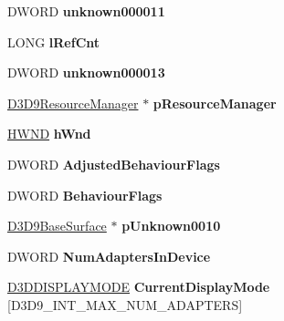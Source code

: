 \begin{DoxyCompactItemize}
D\+W\+O\+RD {\bfseries unknown000011}
\item 
\mbox{\label{struct___direct3_d_device9___i_n_t_a3ea35570c04f0521870ac3194a59e335}} 
L\+O\+NG {\bfseries l\+Ref\+Cnt}
\item 
\mbox{\label{struct___direct3_d_device9___i_n_t_adcd8e41d9c87b37cabb25d364d58a220}} 
D\+W\+O\+RD {\bfseries unknown000013}
\item 
\mbox{\label{struct___direct3_d_device9___i_n_t_abb96b3bdae202193f8675bd129b36527}} 
\hyperlink{struct___d3_d9_resource_manager}{D3\+D9\+Resource\+Manager} $\ast$ {\bfseries p\+Resource\+Manager}
\item 
\mbox{\label{struct___direct3_d_device9___i_n_t_a6323a08d8562110b0cb592afadf2458d}} 
\hyperlink{interfacevoid}{H\+W\+ND} {\bfseries h\+Wnd}
\item 
\mbox{\label{struct___direct3_d_device9___i_n_t_a0cbc34a091e071c0e72dd13a744efbc8}} 
D\+W\+O\+RD {\bfseries Adjusted\+Behaviour\+Flags}
\item 
\mbox{\label{struct___direct3_d_device9___i_n_t_a4c673efe449e15b26bb72930a79f3339}} 
D\+W\+O\+RD {\bfseries Behaviour\+Flags}
\item 
\mbox{\label{struct___direct3_d_device9___i_n_t_a296891f851ecc2322bd4ccf0cd97d37e}} 
\hyperlink{struct___d3_d9_base_surface}{D3\+D9\+Base\+Surface} $\ast$ {\bfseries p\+Unknown0010}
\item 
\mbox{\label{struct___direct3_d_device9___i_n_t_aacb67c735849514ef4da99594c75738b}} 
D\+W\+O\+RD {\bfseries Num\+Adapters\+In\+Device}
\item 
\mbox{\label{struct___direct3_d_device9___i_n_t_a2677f654d3ae914bbf26cc0b0c265098}} 
\hyperlink{struct___d3_d_d_i_s_p_l_a_y_m_o_d_e}{D3\+D\+D\+I\+S\+P\+L\+A\+Y\+M\+O\+DE} {\bfseries Current\+Display\+Mode} \mbox{[}D3\+D9\+\_\+\+I\+N\+T\+\_\+\+M\+A\+X\+\_\+\+N\+U\+M\+\_\+\+A\+D\+A\+P\+T\+E\+RS\mbox{]}

\end{DoxyCompactItemize}
